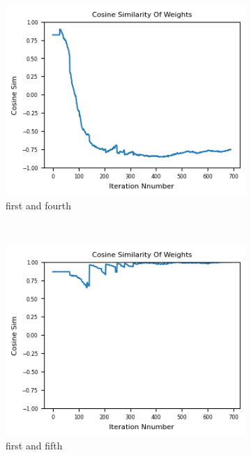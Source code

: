 \documentclass[12pt]{article}
\begin{document}
\begin{figure}[H]
\begin{subfigure}[b]{0.3\textwidth}
    \includegraphics[width=\textwidth]{Figs/0-3.png}
    \caption{first and fourth}
  \end{subfigure}
  \\[\smallskipamount]
  \begin{subfigure}[b]{0.3\textwidth}
    \includegraphics[width=\textwidth]{Figs/0-4.png}
    \caption{first and fifth}
  \end{subfigure}
  \hspace*{10}
  \begin{subfigure}[b]{0.3\textwidth}

\end{subfigure}
\end{figure}
\end{document}
